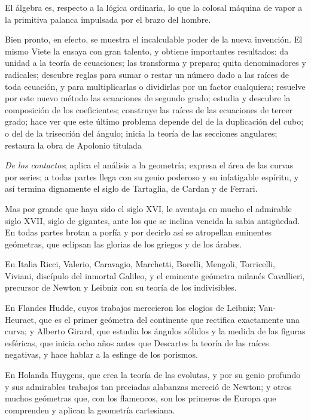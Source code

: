\documentclass[a4paper, 12pt]{article}
\begin{document}
{El álgebra es, respecto a la lógica ordinaria, lo que la colosal máquina de vapor a la primitiva palanca impulsada por el brazo del hombre.

Bien pronto, en efecto, se muestra el incalculable poder de la nueva invención.  El mismo Viete la ensaya con gran talento, y obtiene importantes resultados: da unidad a la teoría de ecuaciones; las transforma y prepara; quita denominadores y radicales; descubre reglas para sumar o restar un número dado a las raíces de toda ecuación, y para multiplicarlas o dividirlas por un factor cualquiera; resuelve por este nuevo método las ecuaciones de segundo grado; estudia y descubre la composición de los coeficientes; construye las raíces de las ecuaciones de tercer grado; hace ver que este último problema depende del de la duplicación del cubo; o del de la trisección del ángulo; inicia la teoría de las secciones angulares; restaura la obra de Apolonio titulada {{{{\it De los contactos}; aplica el análisis a la geometría; expresa el área de las curvas por series; a todas partes llega con su genio poderoso y su infatigable espíritu, y así termina dignamente el siglo de Tartaglia, de Cardan y de Ferrari.

Mas por grande que haya sido el siglo XVI, le aventaja en mucho el admirable siglo XVII, siglo de gigantes, ante los que se inclina vencida la sabia antigüedad.  En todas partes brotan a porfía y por decirlo así se atropellan eminentes geómetras, que eclipsan las glorias de los griegos y de los árabes.

En Italia Ricci, Valerio, Caravagio, Marchetti, Borelli, Mengoli, Torricelli, Viviani, discípulo del inmortal Galileo, y el eminente geómetra milanés Cavallieri, precursor de Newton y Leibniz con su teoría de los indivisibles.



En Flandes Hudde, cuyos trabajos merecieron los elogios de Leibniz; Van-Heuraet, que es el primer geómetra del continente que rectifica exactamente una curva; y Alberto Girard, que estudia los ángulos sólidos y la medida de las figuras esféricas, que inicia ocho años antes que Descartes la teoría de las raíces negativas, y hace hablar a la esfinge de los porismos.

En Holanda Huygens, que crea la teoría de las evolutas, y por su genio profundo y sus admirables trabajos tan preciadas alabanzas mereció de Newton; y otros muchos geómetras que, con los flamencos, son los primeros de Europa que comprenden y aplican la geometría cartesiana.

}}}}
\end{document}
